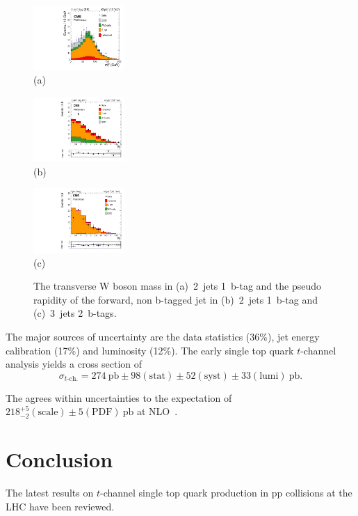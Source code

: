\documentclass{PoS}
\begin{document}
\begin{figure}[htbp]
\begin{center}
\parbox[t]{0.32\textwidth}{\centering\includegraphics[width=0.31\textwidth]{cms_xsec13/mtw.pdf}\\(a)}
\parbox[t]{0.32\textwidth}{\centering\includegraphics[width=0.31\textwidth]{cms_xsec13/mu2j1t.pdf}\\(b)}
\parbox[t]{0.32\textwidth}{\centering\includegraphics[width=0.31\textwidth]{cms_xsec13/mu3j2t.pdf}\\(c)}
\end{center}
\caption{\label{fig:singletop13}The transverse W boson mass in (a)~2~jets 1~b-tag and the pseudo rapidity of the forward, non b-tagged jet in (b)~2~jets 1~b-tag and (c)~3~jets 2~b-tags.}
\end{figure}

The major sources of uncertainty are the data statistics (36\%), jet energy calibration (17\%) and luminosity (12\%).
The early single top quark $t$-channel analysis yields a cross section of
\begin{equation}
\sigma_{t\mbox{-}\mathrm{ch.}}=274~\mathrm{pb}\pm98\mathrm{(stat)}\pm52\mathrm{(syst)}\pm33\mathrm{(lumi)}~\mathrm{pb}.
\end{equation}

The agrees within uncertainties to the expectation of $218_{-2}^{+5}\mathrm{(scale)}\pm5\mathrm{(PDF)}~\mathrm{pb}$ at NLO~\cite{Kidonakis-8tev}.

\section{Conclusion}
The latest results on $t$-channel single top quark production in pp collisions at the LHC have been reviewed.
\end{document}
